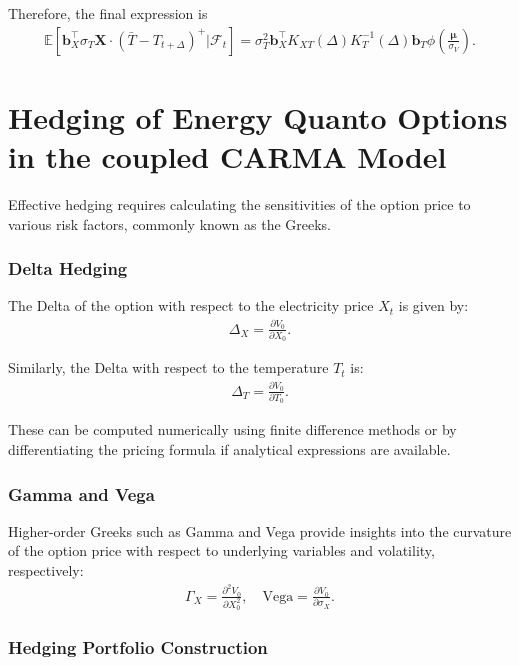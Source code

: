 \documentclass[10pt,a4paper,reqno]{amsart}
\theoremstyle{example}
\begin{document}
Therefore, the final expression is
\begin{align}
\mathbb{E}\left[ \mathbf{b}_X^\intercal \sigma_T \mathbf{X} \cdot (\bar{T} - T_{t+\Delta})^+ \Bigg| \mathcal{F}_t \right] = \sigma_T^2 \mathbf{b}_X^\intercal K_{XT}(\Delta) K_T^{-1}(\Delta) \mathbf{b}_T \phi\left( \frac{\boldsymbol{\mu}}{\sigma_V} \right).
\end{align}


\clearpage{}

\section{Hedging of Energy Quanto Options in the coupled CARMA Model}

Effective hedging requires calculating the sensitivities of the option price to various risk factors, commonly known as the Greeks.

\subsubsection{Delta Hedging}

The Delta of the option with respect to the electricity price $X_t$ is given by:
\begin{align}
    \Delta_X = \frac{\partial V_0}{\partial X_0}.
\end{align}

Similarly, the Delta with respect to the temperature $T_t$ is:
\begin{align}
    \Delta_T = \frac{\partial V_0}{\partial T_0}.
\end{align}

These can be computed numerically using finite difference methods or by differentiating the pricing formula if analytical expressions are available.

\subsubsection{Gamma and Vega}

Higher-order Greeks such as Gamma and Vega provide insights into the curvature of the option price with respect to underlying variables and volatility, respectively:
\begin{align}
    \Gamma_X = \frac{\partial^2 V_0}{\partial X_0^2}, \quad \text{Vega} = \frac{\partial V_0}{\partial \sigma_X}.
\end{align}

\subsubsection{Hedging Portfolio Construction}
\end{document}
